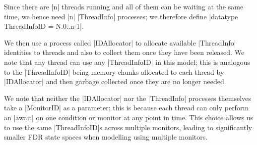 Since there are |n| threads running and all of them can be waiting at the same time, we hence need |n| |ThreadInfo| processes; we therefore define |datatype ThreadInfoID = N.{0..n-1}|. 



We then use a process called |IDAllocator| to allocate available |ThreadInfo| identities to threads and also to collect them once they have been released.
We note that any thread can use any |ThreadInfoID| in this model; this is analogous to the |ThreadInfoID| being memory chunks allocated to each thread by |IDAllocator| and then garbage collected once they are no longer needed. 

We note that neither the |IDAllocator| nor the |ThreadInfo| processes themselves take a |MonitorID| as a parameter; this is because each thread can only perform an |await| on one condition or monitor at any point in time. This choice allows us to use the same |ThreadInfoID|s across multiple monitors, leading to significantly smaller FDR state spaces when modelling using multiple monitors.

